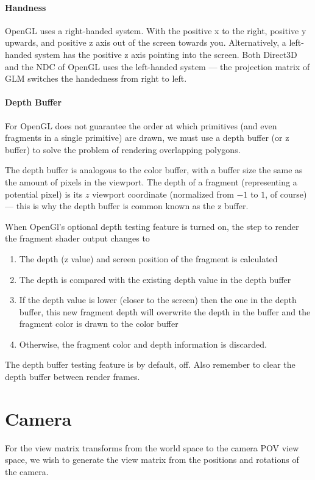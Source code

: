 \documentclass[11pt]{article}
\numberwithin{equation}{section}
\begin{document}
\paragraph{Handness}
OpenGL uses a right-handed system. With the positive x to the right, positive y upwards, and positive z axis out of the screen towards you. Alternatively, a left-handed system has the positive z axis pointing into the screen. Both Direct3D and the NDC of OpenGL uses the left-handed system --- the projection matrix of GLM switches the handedness from right to left.

\paragraph{Depth Buffer}
For OpenGL does not guarantee the order at which primitives (and even fragments in a single primitive) are drawn, we must use a depth buffer (or z buffer) to solve the problem of rendering overlapping polygons.

The depth buffer is analogous to the color buffer, with a buffer size the same as the amount of pixels in the viewport. The depth of a fragment (representing a potential pixel) is its $z$ viewport coordinate (normalized from $-1$ to $1$, of course) --- this is why the depth buffer is common known as the z buffer.

When OpenGl's optional depth testing feature is turned on, the step to render the fragment shader output changes to
\begin{enumerate}
	\item The depth (z value) and screen position of the fragment is calculated
	\item The depth is compared with the existing depth value in the depth buffer
	\item If the depth value is lower (closer to the screen) then the one in the depth buffer, this new fragment depth will overwrite the depth in the buffer and the fragment color is drawn to the color buffer
	\item Otherwise, the fragment color and depth information is discarded.
\end{enumerate}

The depth buffer testing feature is by default, off. Also remember to clear the depth buffer between render frames.

\section{Camera}
For the view matrix transforms from the world space to the camera POV view space, we wish to generate the view matrix from the positions and rotations of the camera.
\end{document}

